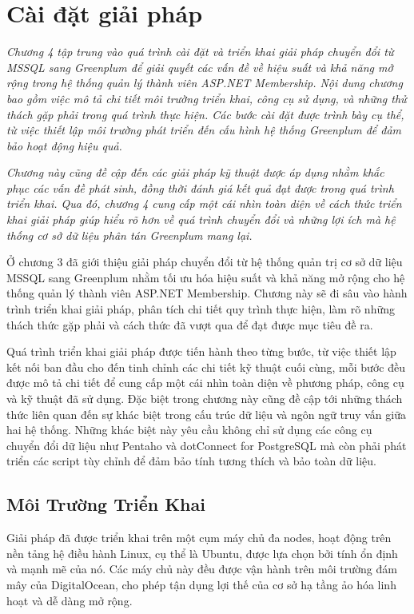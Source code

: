 \section{Cài đặt giải pháp}

\textit{Chương 4 tập trung vào quá trình cài đặt và triển khai giải pháp chuyển đổi từ MSSQL sang Greenplum để giải quyết các vấn đề về hiệu suất và khả năng mở rộng trong hệ thống quản lý thành viên ASP.NET Membership. Nội dung chương bao gồm việc mô tả chi tiết môi trường triển khai, công cụ sử dụng, và những thử thách gặp phải trong quá trình thực hiện. Các bước cài đặt được trình bày cụ thể, từ việc thiết lập môi trường phát triển đến cấu hình hệ thống Greenplum để đảm bảo hoạt động hiệu quả.}

\textit{Chương này cũng đề cập đến các giải pháp kỹ thuật được áp dụng nhằm khắc phục các vấn đề phát sinh, đồng thời đánh giá kết quả đạt được trong quá trình triển khai. Qua đó, chương 4 cung cấp một cái nhìn toàn diện về cách thức triển khai giải pháp giúp hiểu rõ hơn về quá trình chuyển đổi và những lợi ích mà hệ thống cơ sở dữ liệu phân tán Greenplum mang lại.}

Ở chương 3 đã giới thiệu giải pháp chuyển đổi từ hệ thống quản trị cơ sở dữ liệu MSSQL sang Greenplum nhằm tối ưu hóa hiệu suất và khả năng mở rộng cho hệ thống quản lý thành viên ASP.NET Membership. Chương này sẽ đi sâu vào hành trình triển khai giải pháp, phân tích chi tiết quy trình thực hiện, làm rõ những thách thức gặp phải và cách thức đã vượt qua để đạt được mục tiêu đề ra.

Quá trình triển khai giải pháp được tiến hành theo từng bước, từ việc thiết lập kết nối ban đầu cho đến tinh chỉnh các chi tiết kỹ thuật cuối cùng, mỗi bước đều được mô tả chi tiết để cung cấp một cái nhìn toàn diện về phương pháp, công cụ và kỹ thuật đã sử dụng. Đặc biệt trong chương này cũng đề cập tới những thách thức liên quan đến sự khác biệt trong cấu trúc dữ liệu và ngôn ngữ truy vấn giữa hai hệ thống. Những khác biệt này yêu cầu không chỉ sử dụng các công cụ chuyển đổi dữ liệu như Pentaho và dotConnect for PostgreSQL mà còn phải phát triển các script tùy chỉnh để đảm bảo tính tương thích và bảo toàn dữ liệu.


\subsection{Môi Trường Triển Khai}

Giải pháp đã được triển khai trên một cụm máy chủ đa nodes, hoạt động trên nền tảng hệ điều hành Linux, cụ thể là Ubuntu, được lựa chọn bởi tính ổn định và mạnh mẽ của nó. Các máy chủ này đều được vận hành trên môi trường đám mây của DigitalOcean, cho phép tận dụng lợi thế của cơ sở hạ tầng ảo hóa linh hoạt và dễ dàng mở rộng.

